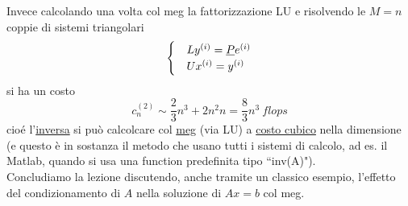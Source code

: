 \documentclass[12pt,a4paper]{article}
\begin{document}
Invece calcolando una volta col meg la fattorizzazione LU e risolvendo le $M=n$ coppie di sistemi triangolari
\begin{equation*}
    \begin{cases}
        & Ly^{(i)} = \uline{P}e^{(i)} \\
        & Ux^{(i)} = y^{(i)}
    \end{cases}
\end{equation*}
si ha un costo 
\begin{equation*}
    c_n^{(2)} \sim \frac{2}{3}n^3 + 2n^2n = \frac{8}{3}n^3 \ flops
\end{equation*}
cioé l'\uline{inversa} si può calcolcare col \uline{meg} (via LU) a \uline{costo cubico} nella dimensione (e questo è in sostanza il metodo che usano tutti i sistemi di calcolo, ad es. il Matlab, quando si usa una function predefinita tipo ``inv(A)").\\
Concludiamo la lezione discutendo, anche tramite un classico esempio, l'effetto del condizionamento di $A$ nella soluzione di $Ax=b$ col meg.
\end{document}
